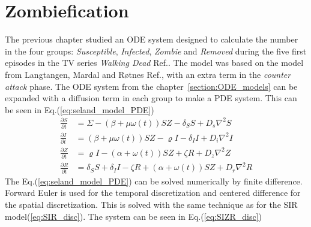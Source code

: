 \documentclass[%
twoside,                 %
final,                   %
chapterprefix=true,      %
open=right               %
10pt]{book}
\begin{document}
\section{Zombiefication}
\label{section:2_zombiefication}
The previous chapter studied an ODE system designed to calculate the number in the four groups: \emph{Susceptible}, \emph{Infected}, \emph{Zombie} and \emph{Removed} during the five first episodes in the TV series \emph{Walking Dead} Ref.\cite{walking_dead}. The model was based on the model from Langtangen, Mardal and Røtnes Ref.\cite{zombie-math}, with an extra term in the \emph{counter attack} phase. The ODE system from the chapter~\ref{section:ODE_models} can be expanded with a diffusion term in each group to make a PDE system. This can be seen in Eq.(\ref{eq:seland_model_PDE})  
\begin{equation} \label{eq:seland_model_PDE}
	\begin{aligned} 
	\frac{\partial S}{\partial t} &= \Sigma -(\beta+\mu \omega(t))SZ - \delta_SS +D_s\nabla^2 S \\
	\frac{\partial I}{\partial t} &= (\beta+\mu \omega(t))SZ - \varrho I - \delta_II+D_i\nabla^2 I \\
	\frac{\partial Z}{\partial t} &= \varrho I- (\alpha+\omega(t))SZ + \zeta R+D_z\nabla^2 Z \\
	\frac{\partial R}{\partial t} &= \delta_SS +\delta_II -\zeta R + (\alpha+\omega(t))SZ+D_r\nabla^2 R 
	\end{aligned}
\end{equation}
The Eq.(\ref{eq:seland_model_PDE}) can be solved numerically by finite difference. Forward Euler is used for the temporal discretization and centered difference for the spatial discretization. This is solved with the same technique as for the SIR model(\ref{eq:SIR_disc}). The system can be seen in Eq.(\ref{eq:SIZR_disc})
\end{document}
